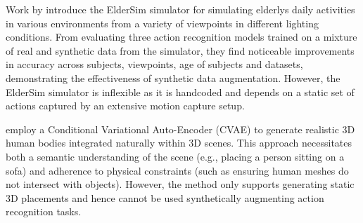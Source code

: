 Work by \cite{Hwang_2020} introduce the ElderSim simulator for simulating elderlys daily activities in various environments from a variety of viewpoints in different lighting conditions. From evaluating three action recognition models trained on a mixture of real and synthetic data from the simulator, they find noticeable improvements in accuracy across subjects, viewpoints, age of subjects and datasets, demonstrating the effectiveness of synthetic data augmentation. However, the ElderSim simulator is inflexible as it is handcoded and depends on a static set of actions captured by an extensive motion capture setup. 

\cite{PSI:2019} employ a Conditional Variational Auto-Encoder (CVAE) to generate realistic 3D human bodies integrated naturally within 3D scenes. This approach necessitates both a semantic understanding of the scene (e.g., placing a person sitting on a sofa) and adherence to physical constraints (such as ensuring human meshes do not intersect with objects). However, the method only supports generating static 3D placements and hence cannot be used synthetically augmenting action recognition tasks. 








